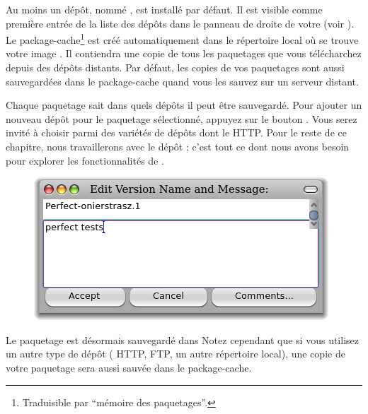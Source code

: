 \documentclass[a4paper,10pt,twoside]{book}
\begin{document}
Au moins un dépôt, nommé , est installé par défaut.
Il est visible comme première entrée de la liste des dépôts dans le
panneau de droite de votre \MCB (voir ).
Le package-cache\footnote{Traduisible par ``mémoire des paquetages''.}
est créé automatiquement dans le répertoire local où
se trouve votre image \pharo.
Il contiendra une copie de tous les paquetages que vous télécharchez
depuis des dépôts distants.
Par défaut, les copies de vos paquetages sont aussi sauvegardées dans
le package-cache quand vous les sauvez sur un serveur distant.

Chaque paquetage sait dans quels dépôts il peut être sauvegardé.
Pour ajouter un nouveau dépôt pour le paquetage sélectionné, appuyez
sur le bouton . Vous serez invité à choisir parmi
des variétés de dépôts dont le HTTP. Pour le reste de ce chapitre,
nous travaillerons avec le dépôt ; c'est tout ce
dont nous avons besoin pour explorer les fonctionnalités de \MC.


\begin{figure}[ht]\centering
	\includegraphics[width=.6\textwidth]{saving}
	\caption{}
\end{figure}

Le paquetage  est désormais sauvegardé dans
Notez cependant que si vous utilisez un autre type de dépôt
  (\eg{} HTTP, FTP, un autre répertoire local), une copie de votre
  paquetage sera aussi sauvée dans le package-cache. 
\end{document}
